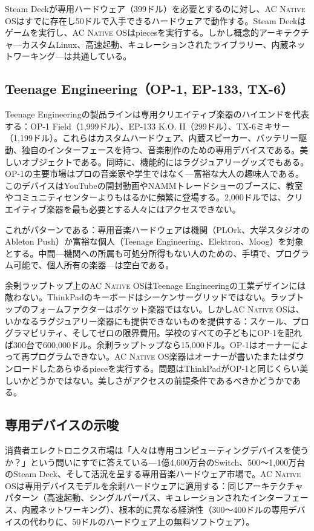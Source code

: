 \documentclass[10pt,letterpaper,twocolumn]{article}
\newcommand{\acos}{\textsc{AC Native OS}}
\begin{document}
Steam Deckが専用ハードウェア（399ドル）を必要とするのに対し、\acos{}はすでに存在し50ドルで入手できるハードウェアで動作する。Steam Deckはゲームを実行し、\acos{}はpiecesを実行する。しかし概念的アーキテクチャ---カスタムLinux、高速起動、キュレーションされたライブラリー、内蔵ネットワーキング---は共通している。

\subsection{Teenage Engineering（OP-1, EP-133, TX-6）}

Teenage Engineeringの製品ラインは専用クリエイティブ楽器のハイエンドを代表する：OP-1 Field（1,999ドル）、EP-133 K.O. II（299ドル）、TX-6ミキサー（1,199ドル）。これらはカスタムハードウェア、内蔵スピーカー、バッテリー駆動、独自のインターフェースを持つ、音楽制作のための専用デバイスである。美しいオブジェクトである。同時に、機能的にはラグジュアリーグッズでもある。OP-1の主要市場はプロの音楽家や学生ではなく---富裕な大人の趣味人である。このデバイスはYouTubeの開封動画やNAMMトレードショーのブースに、教室やコミュニティセンターよりもはるかに頻繁に登場する。2,000ドルでは、クリエイティブ楽器を最も必要とする人々にはアクセスできない。

これがパターンである：専用音楽ハードウェアは機関（PLOrk、大学スタジオのAbleton Push）か富裕な個人（Teenage Engineering、Elektron、Moog）を対象とする。中間---機関への所属も可処分所得もない人のための、手頃で、プログラム可能で、個人所有の楽器---は空白である。

余剰ラップトップ上の\acos{}はTeenage Engineeringの工業デザインには敵わない。ThinkPadのキーボードはシーケンサーグリッドではない。ラップトップのフォームファクターはポケット楽器ではない。しかし\acos{}は、いかなるラグジュアリー楽器にも提供できないものを提供する：スケール、プログラマビリティ、そしてゼロの限界費用。学校のすべての子どもにOP-1を配れば300台で600,000ドル。余剰ラップトップなら15,000ドル。OP-1はオーナーによって再プログラムできない。\acos{}楽器はオーナーが書いたまたはダウンロードしたあらゆるpieceを実行する。問題はThinkPadがOP-1と同じくらい美しいかどうかではない。美しさがアクセスの前提条件であるべきかどうかである。

\subsection{専用デバイスの示唆}

消費者エレクトロニクス市場は「人々は専用コンピューティングデバイスを使うか？」という問いにすでに答えている---1億4,600万台のSwitch、500〜1,000万台のSteam Deck、そして活況を呈する専用音楽ハードウェア市場で。\acos{}は専用デバイスモデルを余剰ハードウェアに適用する：同じアーキテクチャパターン（高速起動、シングルパーパス、キュレーションされたインターフェース、内蔵ネットワーキング）、根本的に異なる経済性（300〜400ドルの専用デバイスの代わりに、50ドルのハードウェア上の無料ソフトウェア）。
\end{document}

